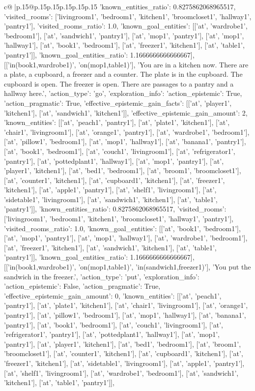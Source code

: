 \documentclass{article}
\begin{document}
{\begin{supertabular}{c@{$\;$}|p{.15\linewidth}@{}p{.15\linewidth}p{.15\linewidth}p{.15\linewidth}p{.15\linewidth}p{.15\linewidth}}
{{{'known_entities_ratio': 0.8275862068965517, 'visited_rooms': ['livingroom1', 'bedroom1', 'kitchen1', 'broomcloset1', 'hallway1', 'pantry1'], 'visited_rooms_ratio': 1.0, 'known_goal_entities': [['at', 'wardrobe1', 'bedroom1'], ['at', 'sandwich1', 'pantry1'], ['at', 'mop1', 'pantry1'], ['at', 'mop1', 'hallway1'], ['at', 'book1', 'bedroom1'], ['at', 'freezer1', 'kitchen1'], ['at', 'table1', 'pantry1']], 'known_goal_entities_ratio': 1.1666666666666667}}], [['in(book1,wardrobe1)', 'on(mop1,table1)'], 'You are in a kitchen now. There are a plate, a cupboard, a freezer and a counter. The plate is in the cupboard. The cupboard is open. The freezer is open. There are passages to a pantry and a hallway here.', {'action_type': 'go', 'exploration_info': {'action_epistemic': True, 'action_pragmatic': True, 'effective_epistemic_gain_facts': [['at', 'player1', 'kitchen1'], ['at', 'sandwich1', 'kitchen1']], 'effective_epistemic_gain_amount': 2, 'known_entities': [['at', 'peach1', 'pantry1'], ['at', 'plate1', 'kitchen1'], ['at', 'chair1', 'livingroom1'], ['at', 'orange1', 'pantry1'], ['at', 'wardrobe1', 'bedroom1'], ['at', 'pillow1', 'bedroom1'], ['at', 'mop1', 'hallway1'], ['at', 'banana1', 'pantry1'], ['at', 'book1', 'bedroom1'], ['at', 'couch1', 'livingroom1'], ['at', 'refrigerator1', 'pantry1'], ['at', 'pottedplant1', 'hallway1'], ['at', 'mop1', 'pantry1'], ['at', 'player1', 'kitchen1'], ['at', 'bed1', 'bedroom1'], ['at', 'broom1', 'broomcloset1'], ['at', 'counter1', 'kitchen1'], ['at', 'cupboard1', 'kitchen1'], ['at', 'freezer1', 'kitchen1'], ['at', 'apple1', 'pantry1'], ['at', 'shelf1', 'livingroom1'], ['at', 'sidetable1', 'livingroom1'], ['at', 'sandwich1', 'kitchen1'], ['at', 'table1', 'pantry1']], 'known_entities_ratio': 0.8275862068965517, 'visited_rooms': ['livingroom1', 'bedroom1', 'kitchen1', 'broomcloset1', 'hallway1', 'pantry1'], 'visited_rooms_ratio': 1.0, 'known_goal_entities': [['at', 'book1', 'bedroom1'], ['at', 'mop1', 'pantry1'], ['at', 'mop1', 'hallway1'], ['at', 'wardrobe1', 'bedroom1'], ['at', 'freezer1', 'kitchen1'], ['at', 'sandwich1', 'kitchen1'], ['at', 'table1', 'pantry1']], 'known_goal_entities_ratio': 1.1666666666666667}}], [['in(book1,wardrobe1)', 'on(mop1,table1)', 'in(sandwich1,freezer1)'], 'You put the sandwich in the freezer.', {'action_type': 'put', 'exploration_info': {'action_epistemic': False, 'action_pragmatic': True, 'effective_epistemic_gain_amount': 0, 'known_entities': [['at', 'peach1', 'pantry1'], ['at', 'plate1', 'kitchen1'], ['at', 'chair1', 'livingroom1'], ['at', 'orange1', 'pantry1'], ['at', 'pillow1', 'bedroom1'], ['at', 'mop1', 'hallway1'], ['at', 'banana1', 'pantry1'], ['at', 'book1', 'bedroom1'], ['at', 'couch1', 'livingroom1'], ['at', 'refrigerator1', 'pantry1'], ['at', 'pottedplant1', 'hallway1'], ['at', 'mop1', 'pantry1'], ['at', 'player1', 'kitchen1'], ['at', 'bed1', 'bedroom1'], ['at', 'broom1', 'broomcloset1'], ['at', 'counter1', 'kitchen1'], ['at', 'cupboard1', 'kitchen1'], ['at', 'freezer1', 'kitchen1'], ['at', 'sidetable1', 'livingroom1'], ['at', 'apple1', 'pantry1'], ['at', 'shelf1', 'livingroom1'], ['at', 'wardrobe1', 'bedroom1'], ['at', 'sandwich1', 'kitchen1'], ['at', 'table1', 'pantry1']], }}}
\end{supertabular}}
\end{document}
